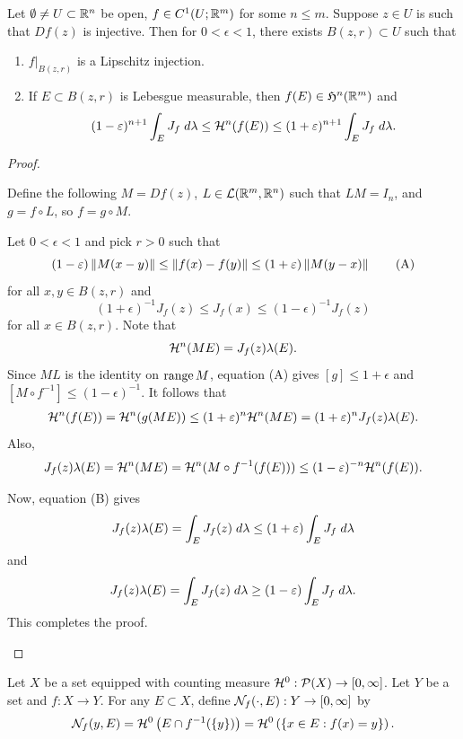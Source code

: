 \documentclass[a4paper]{article}
\begin{document}
\begin{lemma}
Let $\emptyset \neq U \subset \mathbb{R}^n$ be open, $f \in C^1 (U ; \mathbb{R}^m)$
for some $n \leq m$. Suppose $z \in U$ is such that
$Df(z)$ is injective. Then for $0 < \epsilon < 1$, there
exists $B(z, r) \subset U$ such that
\begin{enumerate}
\item $f \vert_{B(z, r)}$ is a Lipschitz injection.
\item If $E \subset B(z, r)$ is Lebesgue measurable,
then $f(E) \in \mathfrak{H}^n (\mathbb{R}^m)$ and
\[
(1 - \varepsilon)^{n+1}
\int_E J_f \; d \lambda
\leq \mathcal{H}^n (f(E)) \leq
(1 + \varepsilon)^{n+1} \int_E J_f \; d \lambda.
\]
\end{enumerate}
\end{lemma}

\begin{proof}
\begin{enumerate}
Define the following $M = Df(z)$, $L \in \mathcal{L}(\mathbb{R}^m, \mathbb{R}^n)$
such that $L M = I_n$, and $g = f \circ L$, so $f = g \circ M$.

Let $0 < \epsilon < 1$ and pick $r > 0$ such that
\[
  (1 - \varepsilon) \left\lVert M (x - y)\right\rVert
  \leq \left\lVert f(x) - f(y)\right\rVert \leq
  (1 + \varepsilon) \left\lVert M (y - x)\right\rVert
  \tag{A}
\]
for all $x, y \in B(z, r)$
and
\[
  (1 + \epsilon)^{-1} J_f(z)
  \leq J_f(x) \leq
  (1 - \epsilon)^{-1} J_f(z)
  \tag{B}
\]
for all $x \in B(z, r)$. Note that
\[
\mathcal{H}^n (ME) = J_f(z) \lambda(E).
\]
Since $ML$ is the identity on $\operatorname{range} M$,
equation (A) gives $[g] \leq 1 + \epsilon$ and
$[M \circ f^{-1}] \leq (1 - \epsilon)^{-1}$.
It follows that
\[
\begin{aligned}
\mathcal{H}^n (f(E)) = \mathcal{H}^n(g(ME))
\leq (1 + \varepsilon)^n \mathcal{H}^n (ME)
= (1 + \varepsilon)^n J_f(z) \lambda(E).
\end{aligned}
\]
Also,
\[
J_f(z) \lambda (E) = \mathcal{H}^n (ME)
= \mathcal{H}^n (M \circ f^{-1} (f(E)))
\leq (1 - \varepsilon)^{-n} \mathcal{H}^n (f(E)).
\]

Now, equation (B) gives
\[
J_f(z) \lambda(E)
= \int_E J_f(z) \; d \lambda
\leq (1 + \varepsilon) \int_E J_f \; d \lambda
\]
and
\[
J_f(z) \lambda(E)
= \int_E J_f(z) \; d \lambda
\geq (1 - \varepsilon) \int_E J_f \; d \lambda.
\]
This completes the proof.

\end{enumerate}
\end{proof}

\begin{defi}
Let $X$ be a set equipped with counting measure
$\mathcal{H}^0 : \mathcal{P}(X) \to [0, \infty]$. Let $Y$ be a set
and $f: X \to Y$. For any $E \subset X$, define
$\mathcal{N}_f (\cdot, E) : Y \to [0, \infty]$ by
\[
\mathcal{N}_f(y, E) = \mathcal{H}^0 \left( E \cap f^{-1} (\{y\}) \right)
= \mathcal{H}^0 \left( \left\{ x \in E: f(x) = y \right\} \right).
\]
\end{defi}
\end{document}
